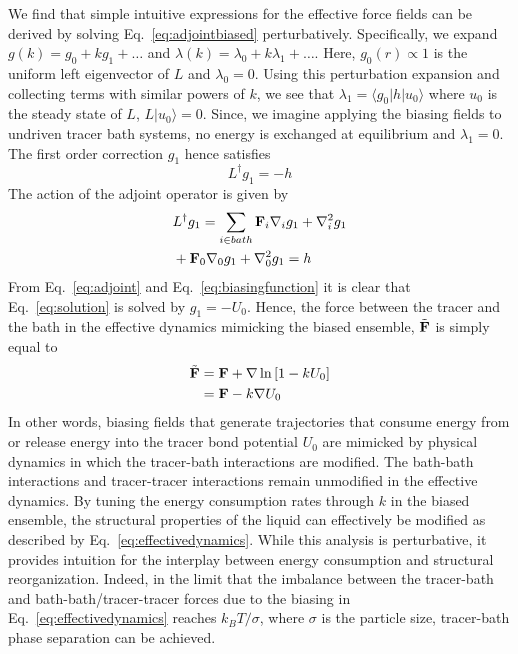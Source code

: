 \documentclass[pre,amsmath,preprintnumbers,10pt,article,notitlepage,twocolumn]{revtex4-1}
\begin{document}
We find that simple intuitive expressions for the effective force fields can be derived by solving Eq.~\ref{eq:adjointbiased} perturbatively. Specifically, we expand $g(k)=g_0 + k g_1 + \dots$ and $\lambda(k)= \lambda_0 + k \lambda_1+ \dots$. Here, $g_0(r)\propto 1$ is the uniform left eigenvector of $L$ and $\lambda_0=0$. Using this perturbation expansion and collecting terms with similar powers of $k$, we see that $\lambda_1= \langle g_0 | h |u_0\rangle$ where $u_0$ is the steady state of $L$, $L |u_0\rangle=0$. Since, we imagine applying the biasing fields to undriven tracer bath systems, no energy is exchanged at equilibrium and $\lambda_1=0$. The first order correction $g_1$ hence satisfies 
\begin{equation}
L^\dagger g_1 = -h
\label{eq:solution}
\end{equation}
The action of the adjoint operator is given by 
\begin{equation}
\begin{split}
& L^\dagger g_1  =\sum_{i \in bath} {\bf F}_i \nabla_i g_1 +\nabla^2_i g_1 \\& +{\bf F}_{0}\nabla_0 g_1 +\nabla^2_0 g_1 =h 
\end{split}
\label{eq:adjoint}
\end{equation}
From Eq.~\ref{eq:adjoint} and Eq.~\ref{eq:biasingfunction} it is clear that Eq.~\ref{eq:solution} is solved by $g_1=-U_0$. Hence, the force between the tracer and the bath in the effective dynamics mimicking the biased ensemble, $\tilde {\bf F}$ is simply equal to 
\begin{equation}
\begin{split}
\tilde {\bf F} &= {\bf F} + {\bf \nabla} \ln \left[1-k U_0\right] \\
& ={\bf F} - k{\bf \nabla} U_0
\end{split}
\label{eq:effectivedynamics}
\end{equation}
In other words, biasing fields that generate trajectories that consume energy from or release energy into the tracer bond potential $U_0$ are mimicked by physical dynamics in which the tracer-bath interactions are modified. The bath-bath interactions and tracer-tracer interactions remain unmodified in the effective dynamics. By tuning the energy consumption rates through $k$ in the biased ensemble, the structural properties of the liquid can effectively be modified as described by Eq.~\ref{eq:effectivedynamics}. 
While this analysis is perturbative, it provides intuition for the interplay between energy consumption and structural reorganization. Indeed, in the limit that the imbalance between the tracer-bath and bath-bath/tracer-tracer forces due to the biasing in Eq.~\ref{eq:effectivedynamics} reaches $k_BT/\sigma$, where $\sigma$ is the particle size, tracer-bath phase separation can be achieved. 
\end{document}
